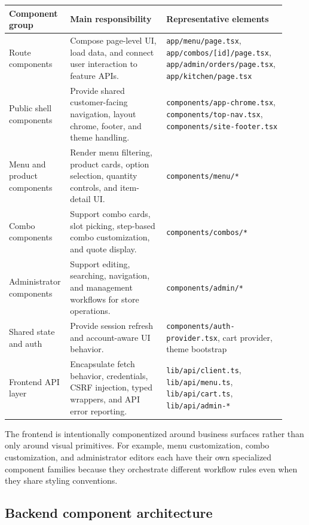 \begingroup
\small
\setlength{\LTpre}{0.4em}
\setlength{\LTpost}{0.8em}
\label{tab:frontend-components}
\begin{tabular}{L{0.19\linewidth} L{0.34\linewidth} L{0.39\linewidth}}
\toprule
\textbf{Component group} & \textbf{Main responsibility} & \textbf{Representative elements} \\
\midrule
Route components & Compose page-level UI, load data, and connect user interaction to feature APIs. & \texttt{app/menu/page.tsx}, \texttt{app/combos/[id]/page.tsx}, \texttt{app/admin/orders/page.tsx}, \texttt{app/kitchen/page.tsx} \\
Public shell components & Provide shared customer-facing navigation, layout chrome, footer, and theme handling. & \texttt{components/app-chrome.tsx}, \texttt{components/top-nav.tsx}, \texttt{components/site-footer.tsx} \\
Menu and product components & Render menu filtering, product cards, option selection, quantity controls, and item-detail UI. & \texttt{components/menu/*} \\
Combo components & Support combo cards, slot picking, step-based combo customization, and quote display. & \texttt{components/combos/*} \\
Administrator components & Support editing, searching, navigation, and management workflows for store operations. & \texttt{components/admin/*} \\
Shared state and auth & Provide session refresh and account-aware UI behavior. & \texttt{components/auth-provider.tsx}, cart provider, theme bootstrap \\
Frontend API layer & Encapsulate fetch behavior, credentials, CSRF injection, typed wrappers, and API error reporting. & \texttt{lib/api/client.ts}, \texttt{lib/api/menu.ts}, \texttt{lib/api/cart.ts}, \texttt{lib/api/admin-*} \\
\bottomrule
\end{tabular}
\endgroup

The frontend is intentionally componentized around business surfaces rather than only around visual primitives. For example, menu customization, combo customization, and administrator editors each have their own specialized component families because they orchestrate different workflow rules even when they share styling conventions.

\subsection{Backend component architecture}

